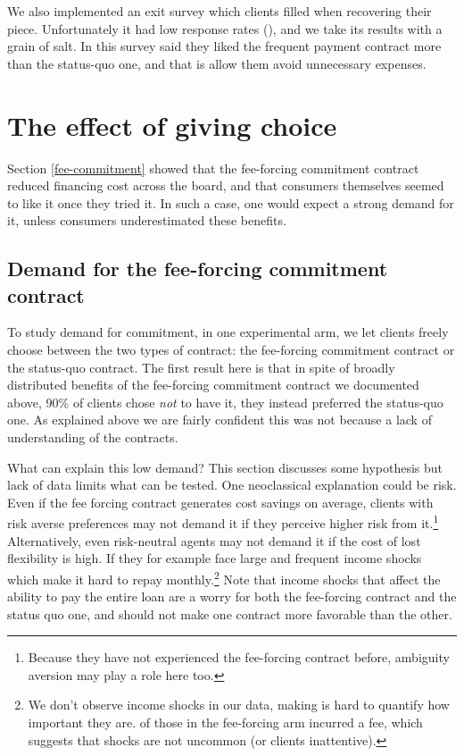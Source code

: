 \documentclass[11pt]{article}
\begin{document}
We also implemented an exit survey which clients filled when recovering their piece. Unfortunately it had low response rates (), and we take its results with a grain of salt. In this survey  said they liked the frequent payment contract more than the status-quo one, and that is allow them avoid unnecessary expenses. 



\section{The effect of giving choice} \label{fee-choice}

Section \ref{fee-commitment} showed that the fee-forcing commitment contract reduced financing cost across the board, and that consumers themselves seemed to like it once they tried it. In such a case, one would expect a strong demand for it, unless consumers underestimated these benefits. 

\subsection{Demand for the fee-forcing commitment contract}

To study demand for commitment, in one experimental arm, we let clients freely choose between the two types of contract: the fee-forcing commitment contract or the status-quo contract. The first result here is that in spite of broadly distributed benefits of the fee-forcing commitment contract we documented above, 90\% of clients chose \textit{not} to have it, they instead preferred the status-quo one. As explained above we are fairly confident this was not because a lack of understanding of the contracts. 

What can explain this low demand? This section discusses some hypothesis but lack of data limits what can be tested. One neoclassical explanation could be risk. Even if the fee forcing contract generates cost savings on average, clients with risk averse preferences may not demand it if they perceive higher risk from it.\footnote{Because they have not experienced the fee-forcing contract before, ambiguity aversion may play a role here too.} Alternatively, even risk-neutral agents may not demand it if the cost of lost flexibility is high. If they for example face large and frequent income shocks which make it hard to repay monthly.\footnote{We don't observe income shocks in our data, making is hard to quantify how important they are.  of those in the fee-forcing arm incurred a fee, which suggests that shocks are not uncommon (or clients inattentive).} Note that income shocks that affect the ability to pay the entire loan are a worry for both the fee-forcing contract and the status quo one, and should not make one contract more favorable than the other.
\end{document}
